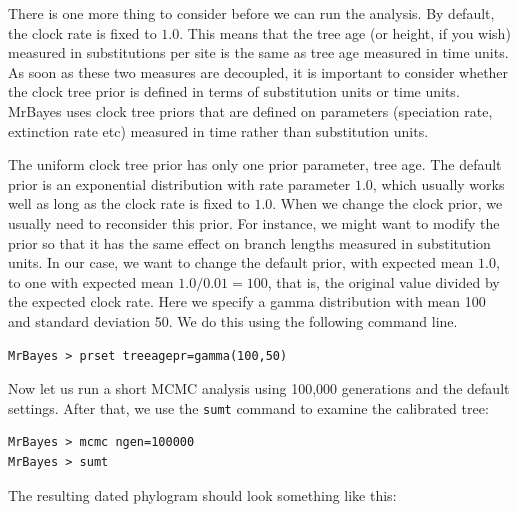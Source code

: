 \documentclass[12pt]{book}
\newcommand{\ttt}[1]{\texttt{#1}}
\begin{document}
There is one more thing to consider before we can run the analysis. By default, the clock rate is
fixed to $1.0$. This means that the tree age (or height, if you wish) measured in substitutions per
site is the same as tree age measured in time units. As soon as these two measures are decoupled,
it is important to consider whether the clock tree prior is defined in terms of substitution units
or time units. MrBayes uses clock tree priors that are defined on parameters (speciation rate,
extinction rate etc) measured in time rather than substitution units.

The uniform clock tree prior has only one prior parameter, tree age. The default prior is an
exponential distribution with rate parameter $1.0$, which usually works well as long as the clock
rate is fixed to $1.0$. When we change the clock prior, we usually need to reconsider this prior.
For instance, we might want to modify the prior so that it has the same effect on branch lengths
measured in substitution units. In our case, we want to change the default prior, with expected
mean $1.0$, to one with expected mean $1.0 / 0.01 = 100$, that is, the original value divided by
the expected clock rate. 
Here we specify a gamma distribution with mean 100 and standard deviation 50.
We do this using the following command line.

\small
\begin{singlespacing}
\begin{verbatim}
MrBayes > prset treeagepr=gamma(100,50)
\end{verbatim}
\end{singlespacing}
\normalsize

Now let us run a short MCMC analysis using 100,000 generations and the default settings. After
that, we use the \ttt{sumt} command to examine the calibrated tree:

\small
\begin{singlespacing}
\begin{verbatim}
MrBayes > mcmc ngen=100000
MrBayes > sumt
\end{verbatim}
\end{singlespacing}
\normalsize

The resulting dated phylogram should look something like this:
\end{document}
